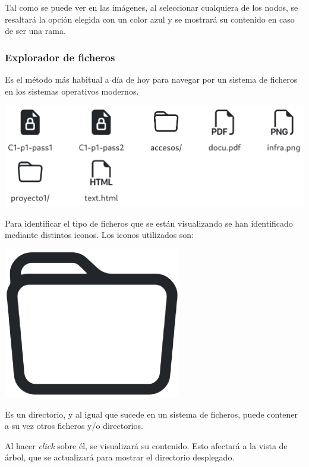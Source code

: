 \documentclass{\ClassPath/viu-tfm-template}
\begin{document}
Tal como se puede ver en las imágenes, al seleccionar cualquiera de los nodos, se resaltará la opción elegida con un color azul y se mostrará su contenido en caso de ser una rama.

\subsubsection*{Explorador de ficheros}

Es el método más habitual a día de hoy para navegar por un sistema de ficheros en los sistemas operativos modernos.

\begin{center}
    \includegraphics[width=0.9\linewidth]{img/browser.png}
\end{center}

Para identificar el tipo de ficheros que se están visualizando se han identificado mediante distintos iconos. Los iconos utilizados son:

{
\begin{minipage}{0.1\linewidth}
    \includegraphics[width=\linewidth]{img/folder.png}
\end{minipage}
\hspace{0.5cm}
\begin{minipage}{0.9\linewidth}
    Es un directorio, y al igual que sucede en un sistema de ficheros, puede contener a su vez otros ficheros y/o directorios.

    Al hacer \textit{click} sobre él, se visualizará su contenido. Esto afectará a la vista de árbol, que se actualizará para mostrar el directorio desplegado.
\end{minipage}
}
\end{document}
